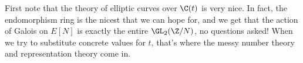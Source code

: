 First note that the theory of elliptic curves over $\C(t)$ is very nice. In fact, the endomorphism ring is the nicest that we can hope for, and we get that the action of Galois on $E[N]$ is exactly the entire $\GL_2(\Z/N)$, no questions asked! When we try to substitute concrete values for $t$, that's where the messy number theory and representation theory come in.
